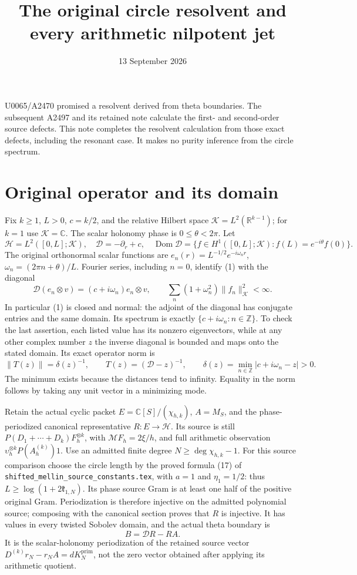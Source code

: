 \documentclass[11pt]{article}
\title{The original circle resolvent and every arithmetic nilpotent jet}
\author{}
\date{13 September 2026}
\begin{document}
\maketitle

U0065/A2470 promised a resolvent derived from theta boundaries. The
subsequent A2497 and its retained note calculate the first- and
second-order source defects. This note completes the resolvent
calculation from those exact defects, including the resonant case.
It makes no purity inference from the circle spectrum.

\section{Original operator and its domain}
Fix \(k\ge1\), \(L>0\), \(c=k/2\), and the relative Hilbert space
\(\mathcal K=L^2(\mathbb R^{k-1})\); for \(k=1\) use
\(\mathcal K=\mathbb C\). The scalar holonomy phase is
\(0\le\theta<2\pi\). Let
\[
 \mathscr H=L^2([0,L];\mathcal K),\quad
 \mathscr D=-\partial_r+c,\quad
 \operatorname{Dom}\mathscr D=
 \{f\in H^1([0,L];\mathcal K):f(L)=e^{-i\theta}f(0)\}.
 \tag{1}
\]
The original orthonormal scalar functions are
\(e_n(r)=L^{-1/2}e^{-i\omega_nr}\),
\(\omega_n=(2\pi n+\theta)/L\). Fourier series, including
\(n=0\), identify (1) with the diagonal
\[
 \mathscr D(e_n\otimes v)=(c+i\omega_n)e_n\otimes v,
 \qquad
 \sum_n(1+\omega_n^2)\|f_n\|_{\mathcal K}^2<\infty.
 \tag{2}
\]
In particular (1) is closed and normal: the adjoint of the diagonal
has conjugate entries and the same domain. Its spectrum is exactly
\(\{c+i\omega_n:n\in\mathbb Z\}\). To check the last assertion,
each listed value has its nonzero eigenvectors, while at any other
complex number \(z\) the inverse diagonal is bounded and maps onto
the stated domain. Its exact operator norm is
\[
 \|T(z)\|=\delta(z)^{-1},\qquad
 T(z)=(\mathscr D-z)^{-1},\qquad
 \delta(z)=\min_{n\in\mathbb Z}|c+i\omega_n-z|>0.
 \tag{3}
\]
The minimum exists because the distances tend to infinity. Equality
in the norm follows by taking any unit vector in a minimizing mode.

Retain the actual cyclic packet
\(E=\mathbb C[S]/(\chi_{h,k})\), \(A=M_S\), and the
phase-periodized canonical representative \(R:E\to\mathscr H\).
Its source is still
\(P(D_1+\cdots+D_k)F_h^{\otimes k}\), with
\(\mathcal MF_h=2\xi/h\), and full arithmetic observation
\(\upsilon_h^{\otimes k}P(A_h^{(k)})1\).
Use an admitted finite degree \(N\ge\deg\chi_{h,k}-1\). For this
source comparison choose the circle length by the proved formula
(17) of \texttt{shifted\_mellin\_source\_constants.tex}, with
\(a=1\) and \(\eta_1=1/2\): thus
\(L\ge\log(1+2\mathfrak k_{1,N})\). Its phase source Gram is at
least one half of the positive original Gram. Periodization is
therefore injective on the admitted polynomial source; composing
with the canonical section proves that \(R\) is injective.
It has values in every twisted Sobolev domain, and the actual theta boundary is
\[
 B=\mathscr D R-RA.
 \tag{4}
\]
It is the scalar-holonomy periodization of the retained source vector
\(D^{(k)}r_N-r_NA=dK_N^{\mathrm{prim}}\), not the zero vector
obtained after applying its arithmetic quotient.
\end{document}
